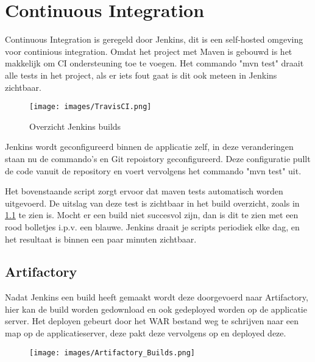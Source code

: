 \chapter{Continuous Integration}
Continuous Integration is geregeld door Jenkins, dit is een self-hosted omgeving voor continious integration.
Omdat het project met Maven is gebouwd is het makkelijk om CI ondersteuning toe te voegen.
Het commando "mvn test" draait alle tests in het project, als er iets fout gaat is dit ook meteen in Jenkins zichtbaar.

\begin{figure}[H]
	\centering\texttt{[image: images/TravisCI.png]}
	\caption{Overzicht Jenkins builds}
	\label{fig:jenkins-commits}
\end{figure}
Jenkins wordt geconfigureerd binnen de applicatie zelf, in deze veranderingen staan nu de commando's en Git repoistory geconfigureerd.
Deze configuratie pullt de code vanuit de repository en voert vervolgens het commando "mvn test" uit.
\par
Het bovenstaande script zorgt ervoor dat maven tests automatisch worden uitgevoerd.
De uitslag van deze test is zichtbaar in het build overzicht, zoals in \cref{fig:jenkins-commits} te zien is. Mocht er een build niet succesvol zijn, dan is dit te zien met een rood bolletjes i.p.v. een blauwe.
Jenkins draait je scripts periodiek elke dag, en het resultaat is binnen een paar minuten zichtbaar.

\section{Artifactory}
Nadat Jenkins een build heeft gemaakt wordt deze doorgevoerd naar Artifactory, hier kan de build worden gedownload en ook gedeployed worden op de applicatie server.
Het deployen gebeurt door het WAR bestand weg te schrijven naar een map op de applicatieserver, deze pakt deze vervolgens op en deployed deze.
\begin{figure}[H]
	\centering\texttt{[image: images/Artifactory\_Builds.png]}
\end{figure}